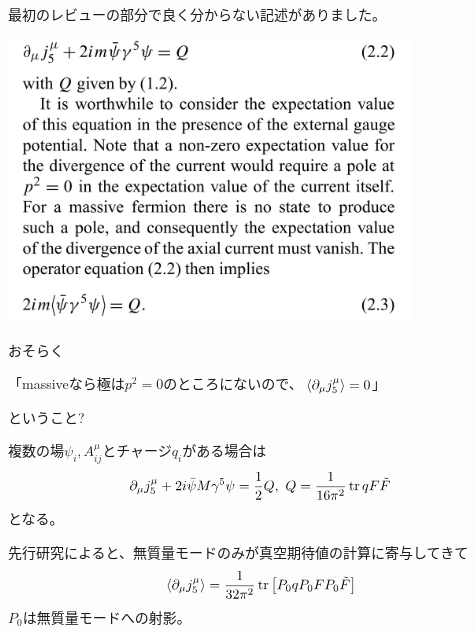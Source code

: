 \documentclass[
  unicode,a4paper,9pt,
  xcolor = {dvipsnames,svgnames},
  hyperref ={colorlinks=true,citecolor=Navy,linkcolor=NavyBlue,urlcolor=purple},
  ja=standard,lualatex
]{beamer}
\begin{document}
\begin{frame}
  \frametitle{\subsecname} 

  最初のレビューの部分で良く分からない記述がありました。

  \begin{center}
    \includegraphics[width=0.8\textwidth]{fig/text_01.png}    
  \end{center}

\end{frame}

\begin{frame}


  おそらく
  \begin{center}
    「massiveなら極は$p^2=0$のところにないので、$\ev*{\partial_{\mu}j^{\mu}_{5}}=0$」
  \end{center}
  ということ?

  \vspace*{5pt}

  複数の場$\psi_{i}, A_{ij}^{\mu}$とチャージ$q_{i}$がある場合は
  \begin{equation*}
    \partial_{\mu}j^{\mu}_{5}
    +
    2i\bar{\psi}M\gamma^{5}\psi
    =
    \frac{1}{2}Q
    ,\ 
    Q
    =
    \frac{1}{16\pi^2}
    \tr qF\tilde{F}
  \end{equation*}
  となる。

  \vspace*{5pt}

  先行研究\cite{Coleman:1982yg}によると、無質量モードのみが真空期待値の計算に寄与してきて
  \begin{equation*}
    \ev*{\partial_{\mu}j^{\mu}_{5}}
    =
    \frac{1}{32\pi^2}
    \tr
    \left[  
      P_{0}qP_{0}FP_{0}\tilde{F}
    \right] 
    \label{eqn:massless_anomaly}
  \end{equation*}  
  $P_{0}$は無質量モードへの射影。

\end{frame}
\end{document}
